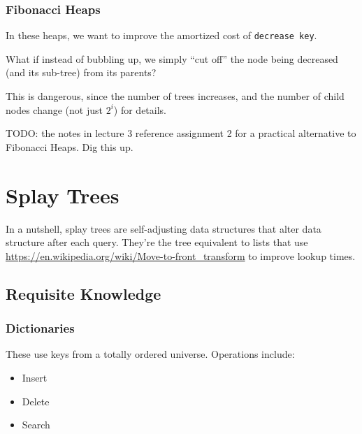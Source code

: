                 \subsection{Fibonacci Heaps} %
                \label{sub:fibonacci_heaps}
                    In these heaps, we want to improve the amortized cost of \verb|decrease key|.

                    What if instead of bubbling up, we simply ``cut off'' the node being decreased (and its sub-tree) from its parents?

                    This is dangerous, since the number of trees increases, and the number of child nodes change (not just $2^i$) for details.

                    TODO: the notes in lecture 3 reference assignment 2 for a practical alternative to Fibonacci Heaps. Dig this up.
        \chapter{Splay Trees} %
        \label{cha:splay_trees}
            In a nutshell, splay trees are self-adjusting data structures that alter data structure after each query.
            They're the tree equivalent to lists that use \href{move-to-front}{https://en.wikipedia.org/wiki/Move-to-front\_transform} to improve lookup times.

            \section{Requisite Knowledge} %
            \label{sec:requisite_knowledge}
                \subsection{Dictionaries} %
                \label{sub:dictionaries}
                    These use keys from a totally ordered universe.
                    Operations include:
                    \begin{itemize}
                        \item Insert
                        \item Delete
                        \item Search
                    \end{itemize}

